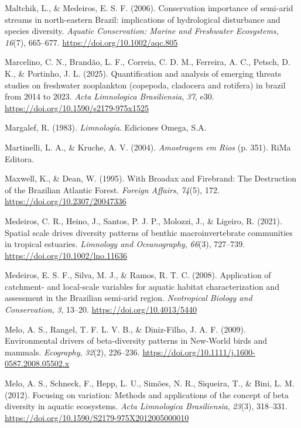 \documentclass[
  letterpaper,
  DIV=11,
  numbers=noendperiod]{scrartcl}
\newlength{\cslhangindent}
\newenvironment{CSLReferences}[2] %
 {\begin{list}{}{%
  \setlength{\itemindent}{0pt}
  \setlength{\leftmargin}{0pt}
  \setlength{\parsep}{0pt}
  \ifodd #1
   \setlength{\leftmargin}{\cslhangindent}
   \setlength{\itemindent}{-1\cslhangindent}
  \fi
  \setlength{\itemsep}{#2\baselineskip}}}
 {\end{list}}
\begin{document}
\begin{CSLReferences}{1}{0}
Maltchik, L., \& Medeiros, E. S. F. (2006). Conservation importance of
semi{-}arid streams in north{-}eastern Brazil: implications of
hydrological disturbance and species diversity. \emph{Aquatic
Conservation: Marine and Freshwater Ecosystems}, \emph{16}(7), 665--677.
\url{https://doi.org/10.1002/aqc.805}

Marcelino, C. N., Brandão, L. F., Correia, C. D. M., Ferreira, A. C.,
Petsch, D. K., \& Portinho, J. L. (2025). Quantification and analysis of
emerging threats studies on freshwater zooplankton (copepoda, cladocera
and rotifera) in brazil from 2014 to 2023. \emph{Acta Limnologica
Brasiliensia}, \emph{37}, e30.
\url{https://doi.org/10.1590/s2179-975x1525}

Margalef, R. (1983). \emph{Limnología}. Ediciones Omega, S.A.

Martinelli, L. A., \& Kruche, A. V. (2004). \emph{Amostragem em Rios}
(p. 351). RiMa Editora.

Maxwell, K., \& Dean, W. (1995). With Broadax and Firebrand: The
Destruction of the Brazilian Atlantic Forest. \emph{Foreign Affairs},
\emph{74}(5), 172. \url{https://doi.org/10.2307/20047336}

Medeiros, C. R., Heino, J., Santos, P. J. P., Molozzi, J., \& Ligeiro,
R. (2021). Spatial scale drives diversity patterns of benthic
macroinvertebrate communities in tropical estuaries. \emph{Limnology and
Oceanography}, \emph{66}(3), 727--739.
\url{https://doi.org/10.1002/lno.11636}

Medeiros, E. S. F., Silva, M. J., \& Ramos, R. T. C. (2008). Application
of catchment- and local-scale variables for aquatic habitat
characterization and assessment in the Brazilian semi-arid region.
\emph{Neotropical Biology and Conservation}, \emph{3}, 13--20.
\url{https://doi.org/10.4013/5440}

Melo, A. S., Rangel, T. F. L. V. B., \& Diniz-Filho, J. A. F. (2009).
Environmental drivers of beta{-}diversity patterns in New{-}World birds
and mammals. \emph{Ecography}, \emph{32}(2), 226--236.
\url{https://doi.org/10.1111/j.1600-0587.2008.05502.x}

Melo, A. S., Schneck, F., Hepp, L. U., Simões, N. R., Siqueira, T., \&
Bini, L. M. (2012). Focusing on variation: Methods and applications of
the concept of beta diversity in aquatic ecosystems. \emph{Acta
Limnologica Brasiliensia}, \emph{23}(3), 318--331.
\url{https://doi.org/10.1590/S2179-975X2012005000010}


\end{CSLReferences}
\end{document}
